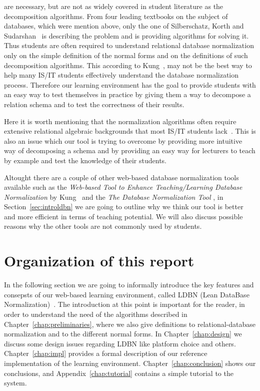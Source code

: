 are necessary, but are not as widely covered in student literature as the 
decomposition algorithms. From four leading textbooks on the subject of 
databases, which were mention above, only the one of Silberschatz, Korth and Sudarshan~\cite{bdb4}
is describing the problem and is providing algorithms for solving it. Thus students 
are often required to understand relational database normalization only on the 
simple definition of the normal forms and on the definitions of such decomposition
algorithms. This according to Kung~\cite{p8}, may not be the best way to help many 
IS/IT students effectively understand the database normalization process. Therefore
our learning environment has the goal to provide students with an easy way 
to test themselves
in practice by giving them a way to decompose a relation schema and to 
test the correctness of their results. 

Here it is worth mentioning that the normalization algorithms often require 
extensive relational algebraic backgrounds that most IS/IT students lack~\cite{p8}. This
is also an issue which our tool is trying to overcome by providing more intuitive 
way of decomposing a schema and by providing an easy way for lecturers to
teach by example and test the knowledge of their students. 

Altought there are a couple of other web-based database normalization tools 
available such as the \textit{Web-based Tool to Enhance Teaching/Learning Database 
Normalization} by Kung~\cite{p8} and the \textit{The Database Normalization Tool}
\cite{w1}, 
in Section~\ref{sec:introldbn} we are going to outline why we think our tool is better 
and more efficient
in terms of teaching potential. We will also discuss possible reasons why the 
other tools are not commonly used by students. 

\section{Organization of this report}
\label{sec:organization}
In the following section we are going to informally introduce 
the key features and consepsts of our web-based learning environment, 
called LDBN (Lean DataBase Normalization)~\cite{wldbn}. 
The introduction at this point is important for the reader,
in order to understand the need of the algorithms described in 
Chapter~\ref{chap:preliminaries}, where we also give definitions to
relational-database normalization and to the different normal forms. 
In Chapter~\ref{chap:design} we discuss some design issues regarding LDBN like 
platform choice and others. Chapter~\ref{chap:impl} provides a formal description
of our reference implementation of the learning environment. 
Chapter~\ref{chap:conclusion} shows our conclusions, and 
Appendix~\ref{chap:tutorial} contains a simple tutorial to the system.


